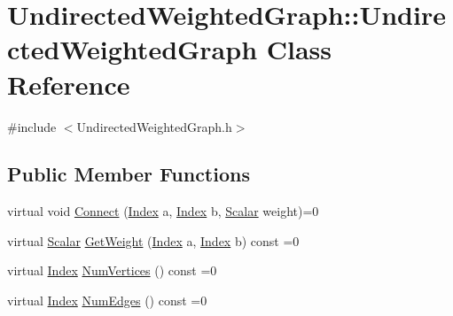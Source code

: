 \hypertarget{class_undirected_weighted_graph_1_1_undirected_weighted_graph}{\section{Undirected\+Weighted\+Graph\+:\+:Undirected\+Weighted\+Graph Class Reference}
\label{class_undirected_weighted_graph_1_1_undirected_weighted_graph}
}


{\ttfamily \#include $<$Undirected\+Weighted\+Graph.\+h$>$}

\subsection*{Public Member Functions}
\begin{DoxyCompactItemize}
\item 
virtual void \hyperlink{class_undirected_weighted_graph_1_1_undirected_weighted_graph_aae320eca34e285123af14776c60fbd4d}{Connect} (\hyperlink{typedefs_8h_a5d7deb06d9443e7d4a47bf078638cc91}{Index} a, \hyperlink{typedefs_8h_a5d7deb06d9443e7d4a47bf078638cc91}{Index} b, \hyperlink{typedefs_8h_a508fc58b5dc3c81865305f6498457063}{Scalar} weight)=0
\item 
virtual \hyperlink{typedefs_8h_a508fc58b5dc3c81865305f6498457063}{Scalar} \hyperlink{class_undirected_weighted_graph_1_1_undirected_weighted_graph_a60a24b6b5018f32f0fcd3d81f7bae3ef}{Get\+Weight} (\hyperlink{typedefs_8h_a5d7deb06d9443e7d4a47bf078638cc91}{Index} a, \hyperlink{typedefs_8h_a5d7deb06d9443e7d4a47bf078638cc91}{Index} b) const =0
\item 
virtual \hyperlink{typedefs_8h_a5d7deb06d9443e7d4a47bf078638cc91}{Index} \hyperlink{class_undirected_weighted_graph_1_1_undirected_weighted_graph_ac5a7274fc4505312a1bb5eade12d33fe}{Num\+Vertices} () const =0
\item 
virtual \hyperlink{typedefs_8h_a5d7deb06d9443e7d4a47bf078638cc91}{Index} \hyperlink{class_undirected_weighted_graph_1_1_undirected_weighted_graph_a9f0a1cd1b73f75ab5738527a4acb0381}{Num\+Edges} () const =0
\end{DoxyCompactItemize}


